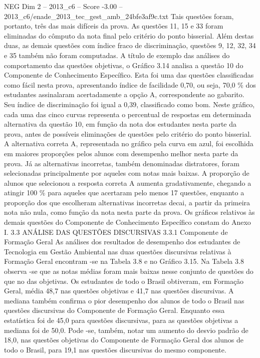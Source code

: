 \begin{textsample}{NEG Dim 2 – 2013\_c6 – Score -3.00 – 2013\_c6/enade\_2013\_tec\_gest\_amb\_24bfe3af9c.txt}
Tais questões foram, portanto, três das mais difíceis da prova.
As questões 11, 15 e 33 foram eliminadas do cômputo da nota final pelo critério do ponto bisserial.
Além destas duas, as demais questões com índice fraco de discriminação, questões 9, 12, 32, 34 e 35 também não foram computadas.
A título de exemplo das análises do comportamento das questões objetivas, o Gráfico 3.14 analisa a questão 10 do Componente de Conhecimento Específico.
Esta foi uma das questões classificadas como fácil nesta prova, apresentando índice de facilidade 0,70, ou seja, 70,0 \% dos estudantes assinalaram acertadamente a opção A, correspondente ao gabarito.
Seu índice de discriminação foi igual a 0,39, classificado como bom.
Neste gráfico, cada uma das cinco curvas representa o percentual de respostas em determinada alternativa da questão 10, em função da nota dos estudantes nesta parte da prova, antes de possíveis eliminações de questões pelo critério do ponto bisserial.
A alternativa correta A, representada no gráfico pela curva em azul, foi escolhida em maiores proporções pelos alunos com desempenho melhor nesta parte da prova.
Já as alternativas incorretas, também denominadas distratores, foram selecionadas principalmente por aqueles com notas mais baixas.
A proporção de alunos que selecionou a resposta correta A aumenta gradativamente, chegando a atingir 100 \% para aqueles que acertaram pelo menos 17 questões, enquanto a proporção dos que escolheram alternativas incorretas decai, a partir da primeira nota não nula, como função da nota nesta parte da prova.
Os gráficos relativos às demais questões do Componente de Conhecimento Específico constam do Anexo I. 3.3 ANÁLISE DAS QUESTÕES DISCURSIVAS 3.3.1 Componente de Formação Geral As análises dos resultados de desempenho dos estudantes de Tecnologia em Gestão Ambiental nas duas questões discursivas relativas à Formação Geral encontram -se na Tabela 3.8 e no Gráfico 3.15.
Na Tabela 3.8 observa -se que as notas médias foram mais baixas nesse conjunto de questões do que no das objetivas.
Os estudantes de todo o Brasil obtiveram, em Formação Geral, média 48,7 nas questões objetivas e 41,7 nas questões discursivas.
A mediana também confirma o pior desempenho dos alunos de todo o Brasil nas questões discursivas do Componente de Formação Geral.
Enquanto essa estatística foi de 45,0 para questões discursivas, para as questões objetivas a mediana foi de 50,0.
Pode -se, também, notar um aumento do desvio padrão de 18,0, nas questões objetivas do Componente de Formação Geral dos alunos de todo o Brasil, para 19,1 nas questões discursivas do mesmo componente.

\end{textsample}
